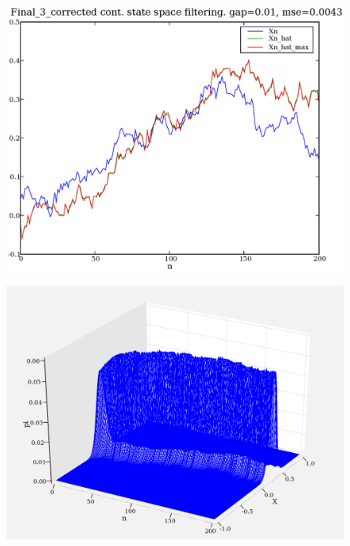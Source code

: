 \documentclass[a4paper,10pt]{article}
\begin{document}
\begin{figure}
\includegraphics[width=1\textwidth]{Final_3_corrected_Xn_Xn_hat_Xn_hat_max_gap_0.01.eps}
\caption{}\label{f7}
\end{figure}

\begin{figure}
\includegraphics[width=1\textwidth]{Final_3_corrected_3d_pi_FDF.eps}
\caption{}\label{f8}
\end{figure}
\end{document}
